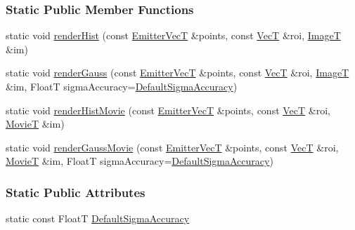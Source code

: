 \subsubsection*{Static Public Member Functions}
\begin{DoxyCompactItemize}
\item 
static void \hyperlink{classsrrender_1_1SRRender2D_a2e1dcc7e39a16514a4b3f1226c0610f5}{render\+Hist} (const \hyperlink{classsrrender_1_1SRRender2D_ac2433ed86b4b21ff082ba8c2a080e26a}{Emitter\+VecT} \&points, const \hyperlink{classsrrender_1_1SRRender2D_ab2b17bb30a0f86d610ef90e2e8e97e25}{VecT} \&roi, \hyperlink{classsrrender_1_1SRRender2D_a84ba69a439ee39a97bb8fed4eebac011}{ImageT} \&im)
\item 
static void \hyperlink{classsrrender_1_1SRRender2D_ac3b2d60e4a9d86950938db63a57b5639}{render\+Gauss} (const \hyperlink{classsrrender_1_1SRRender2D_ac2433ed86b4b21ff082ba8c2a080e26a}{Emitter\+VecT} \&points, const \hyperlink{classsrrender_1_1SRRender2D_ab2b17bb30a0f86d610ef90e2e8e97e25}{VecT} \&roi, \hyperlink{classsrrender_1_1SRRender2D_a84ba69a439ee39a97bb8fed4eebac011}{ImageT} \&im, FloatT sigma\+Accuracy=\hyperlink{classsrrender_1_1SRRender2D_ac1a7fcf709ff55bf7b70e91fff12cce8}{Default\+Sigma\+Accuracy})
\item 
static void \hyperlink{classsrrender_1_1SRRender2D_a8d72c884651325fdf6afa19ad025a877}{render\+Hist\+Movie} (const \hyperlink{classsrrender_1_1SRRender2D_ac2433ed86b4b21ff082ba8c2a080e26a}{Emitter\+VecT} \&points, const \hyperlink{classsrrender_1_1SRRender2D_ab2b17bb30a0f86d610ef90e2e8e97e25}{VecT} \&roi, \hyperlink{classsrrender_1_1SRRender2D_a884febde0e56f7e07fd470f2498eadbd}{MovieT} \&im)
\item 
static void \hyperlink{classsrrender_1_1SRRender2D_ae392b80afdf6dee6d85dd84343dfa7e6}{render\+Gauss\+Movie} (const \hyperlink{classsrrender_1_1SRRender2D_ac2433ed86b4b21ff082ba8c2a080e26a}{Emitter\+VecT} \&points, const \hyperlink{classsrrender_1_1SRRender2D_ab2b17bb30a0f86d610ef90e2e8e97e25}{VecT} \&roi, \hyperlink{classsrrender_1_1SRRender2D_a884febde0e56f7e07fd470f2498eadbd}{MovieT} \&im, FloatT sigma\+Accuracy=\hyperlink{classsrrender_1_1SRRender2D_ac1a7fcf709ff55bf7b70e91fff12cce8}{Default\+Sigma\+Accuracy})
\end{DoxyCompactItemize}
\subsubsection*{Static Public Attributes}
\begin{DoxyCompactItemize}
\item 
static const FloatT \hyperlink{classsrrender_1_1SRRender2D_ac1a7fcf709ff55bf7b70e91fff12cce8}{Default\+Sigma\+Accuracy}
\end{DoxyCompactItemize}


